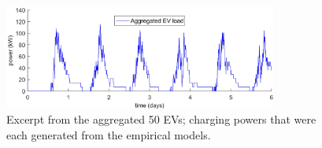 \begin{figure}\centering
 \includegraphics[width=0.8\textwidth]{_chapter4/fig/aggregated-ev-power}
 \caption{Excerpt from the aggregated 50 EVs; charging powers that were each generated from the empirical models.}
 \label{ch4:fig:aggregated-ev-power}
\end{figure}
